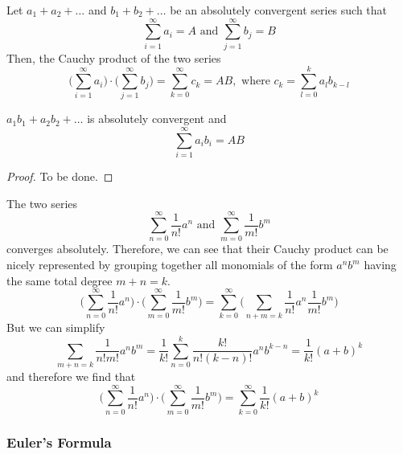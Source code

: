 \documentclass{article}
\begin{document}
    \begin{theorem}
    Let $a_1 + a_2 + \ldots$ and $b_1 + b_2 + \ldots$ be an absolutely convergent series such that
    \[\sum_{i=1}^\infty a_i = A \text{ and } \sum_{j=1}^\infty b_j = B\]
    Then, the Cauchy product of the two series 
    \[\bigg( \sum_{i=1}^\infty a_i \bigg) \cdot \bigg( \sum_{j=1}^\infty b_j \bigg) = \sum_{k=0}^\infty c_k = A B, \text{ where } c_k = \sum_{l=0}^k a_l b_{k-l}\]

    $a_1 b_1 + a_2 b_2 + \ldots$ is absolutely convergent and 
    \[\sum_{i = 1}^\infty a_i b_i = A B\]
    \end{theorem}
    \begin{proof}
    To be done. 
    \end{proof}

      \begin{example}
      The two series 
      \[\sum_{n = 0}^\infty \frac{1}{n!} a^n \text{ and } \sum_{m = 0}^\infty \frac{1}{m!} b^m\]
      converges absolutely. Therefore, we can see that their Cauchy product can be nicely represented by grouping together all monomials of the form $a^n b^m$ having the same total degree $m + n = k$. 
      \[\bigg( \sum_{n = 0}^\infty \frac{1}{n!} a^n \bigg) \cdot \bigg( \sum_{m = 0}^\infty \frac{1}{m!} b^m \bigg) = \sum_{k=0}^\infty \bigg(\sum_{n+m=k} \frac{1}{n!} a^n \frac{1}{m!} b^m \bigg)\]
      But we can simplify 
      \[\sum_{m + n = k} \frac{1}{n! m!} a^n b^m = \frac{1}{k!} \sum_{n=0}^k \frac{k!}{n! (k-n)!} a^n b^{k-n} = \frac{1}{k!} (a + b)^k\]
      and therefore we find that 
      \[\bigg( \sum_{n = 0}^\infty \frac{1}{n!} a^n \bigg) \cdot \bigg( \sum_{m = 0}^\infty \frac{1}{m!} b^m \bigg) = \sum_{k=0}^\infty \frac{1}{k!} (a + b)^k\]
    \end{example}

      \subsubsection{Euler's Formula}
\end{document}
